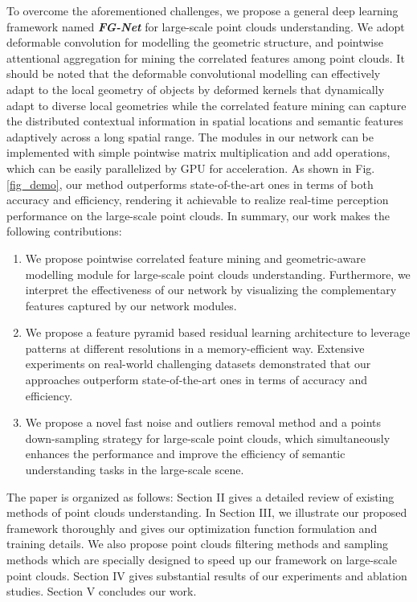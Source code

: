 \documentclass[journal]{IEEEtran}
\begin{document}
To overcome the aforementioned challenges, we propose a general deep learning framework named \textit{\textbf{FG-Net}} for large-scale point clouds understanding. We adopt deformable convolution for modelling the geometric structure, and pointwise attentional aggregation for mining the correlated features among point clouds. It should be noted that the deformable convolutional modelling can effectively adapt to the local geometry of objects by deformed kernels that dynamically adapt to diverse local geometries while the correlated feature mining can capture the distributed contextual information in spatial locations and semantic features adaptively across a long spatial range. The modules in our network can be implemented with simple pointwise matrix multiplication and add operations, which can be easily parallelized by GPU for acceleration. As shown in Fig. \ref{fig_demo}, our method outperforms state-of-the-art ones in terms of both accuracy and efficiency, rendering it achievable to realize real-time perception performance on the large-scale point clouds. In summary, our work makes the following contributions:
\begin{enumerate}[]
\setlength{\itemsep}{0pt}
\setlength{\parskip}{0pt}
\setlength{\parsep}{0pt}
\item We propose pointwise correlated feature mining and geometric-aware modelling module for large-scale point clouds understanding.  Furthermore, we interpret the effectiveness of our network by visualizing the complementary features captured by our network modules. \item 
  We propose a feature pyramid based residual learning architecture to leverage patterns at different resolutions in a memory-efficient way.  Extensive experiments on real-world challenging datasets demonstrated that our approaches outperform state-of-the-art ones in terms of accuracy and efficiency.
\item 
  We propose a novel fast noise and outliers removal method and a points down-sampling strategy for large-scale point clouds, which simultaneously enhances the performance and improve the efficiency of semantic understanding tasks in the large-scale scene. 
  


\end{enumerate} 
The paper is organized as follows: Section II gives a detailed review of existing methods of point clouds understanding. In Section III, we illustrate our proposed framework thoroughly and gives our optimization function formulation and training details. We also propose point clouds filtering methods and sampling methods which are specially designed to speed up our framework on large-scale point clouds. Section IV gives substantial results of our experiments and ablation studies. Section V concludes our work.
\end{document}
